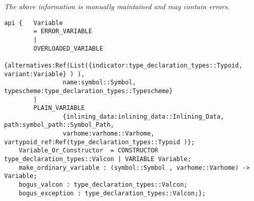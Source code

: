 \label{api:Variables\_And\_Constructors}

{\tiny \it The above information is manually maintained and may contain errors.}
\begin{verbatim}
api {   Variable
        = ERROR_VARIABLE
        |
        OVERLOADED_VARIABLE
                {alternatives:Ref(List({indicator:type_declaration_types::Typoid, variant:Variable} ) ),
                name:symbol::Symbol, typescheme:type_declaration_types::Typescheme}
        |
        PLAIN_VARIABLE
                {inlining_data:inlining_data::Inlining_Data, path:symbol_path::Symbol_Path,
                varhome:varhome::Varhome, vartypoid_ref:Ref(type_declaration_types::Typoid )};
    Variable_Or_Constructor  = CONSTRUCTOR type_declaration_types::Valcon | VARIABLE Variable;
    make_ordinary_variable : (symbol::Symbol , varhome::Varhome) -> Variable;
    bogus_valcon : type_declaration_types::Valcon;
    bogus_exception : type_declaration_types::Valcon;};
\end{verbatim}
